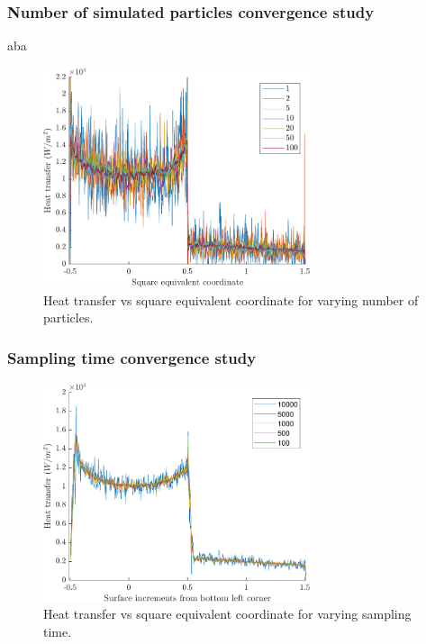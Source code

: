 \subsubsection{Number of simulated particles convergence study}

aba

\begin{figure}[h]
    \centering
    \includegraphics[width=0.7\textwidth]{Images/3. Methodology/Fnum convergence/fnumconv.pdf}
    \caption{Heat transfer vs square equivalent coordinate for varying number of particles.}
    \label{fig:fnumsec}
\end{figure}

\subsubsection{Sampling time convergence study}

\begin{figure}
    \centering
    \includegraphics[width=0.7\textwidth]{Images/3. Methodology/Timestep average convergence/avesec.pdf}
    \caption{Heat transfer vs square equivalent coordinate for varying sampling time.}
    \label{fig:avesec}
\end{figure}

